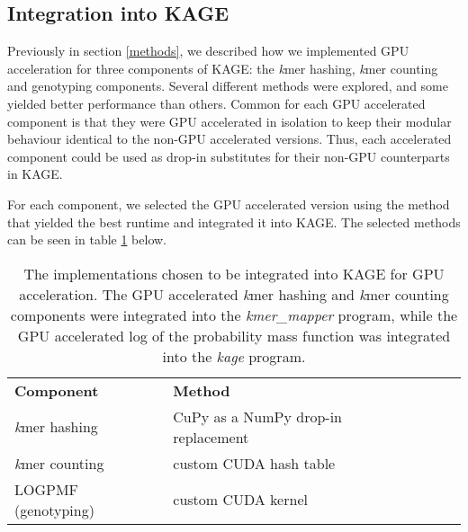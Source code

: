 \subsection{Integration into KAGE} \label{methods:integration_into_kage}
Previously in section \ref{methods}, we described how we implemented GPU acceleration for three components of KAGE: the \textit{k}mer hashing, \textit{k}mer counting and genotyping components.
Several different methods were explored, and some yielded better performance than others.
Common for each GPU accelerated component is that they were GPU accelerated in isolation to keep their modular behaviour identical to the non-GPU accelerated versions.
Thus, each accelerated component could be used as drop-in substitutes for their non-GPU counterparts in KAGE.

For each component, we selected the GPU accelerated version using the method that yielded the best runtime and integrated it into KAGE.
The selected methods can be seen in table \ref{methods:integration_into_kage:tables:chosen_methods} below.

\begin{table}[H]
\begin{center}
\begin{tabular}{lllll}
\multicolumn{1}{l|}{\textbf{Component}} & \multicolumn{1}{l}{\textbf{Method}} &  \\ \cline{1-2}
\multicolumn{1}{l|}{\textit{k}mer hashing} & \multicolumn{1}{l}{CuPy as a NumPy drop-in replacement} &  \\
\multicolumn{1}{l|}{\textit{k}mer counting} & \multicolumn{1}{l}{custom CUDA hash table} &  \\
\multicolumn{1}{l|}{LOGPMF (genotyping)} & \multicolumn{1}{l}{custom CUDA kernel} &  \\
\end{tabular}
\end{center}
\caption{
  The implementations chosen to be integrated into KAGE for GPU acceleration.
  The GPU accelerated \textit{k}mer hashing and \textit{k}mer counting components were integrated into the \textit{kmer\_mapper} program, while the GPU accelerated log of the probability mass function was integrated into the \textit{kage} program.
}
\label{methods:integration_into_kage:tables:chosen_methods}
\end{table}

